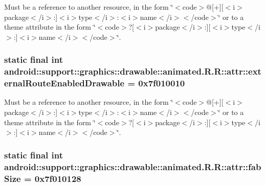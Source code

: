 Must be a reference to another resource, in the form \char`\"{}$<$code$>$@\mbox{[}+\mbox{]}\mbox{[}$<$i$>$package$<$/i$>$:\mbox{]}$<$i$>$type$<$/i$>$:$<$i$>$name$<$/i$>$$<$/code$>$\char`\"{} or to a theme attribute in the form \char`\"{}$<$code$>$?\mbox{[}$<$i$>$package$<$/i$>$:\mbox{]}\mbox{[}$<$i$>$type$<$/i$>$:\mbox{]}$<$i$>$name$<$/i$>$$<$/code$>$\char`\"{}. \hypertarget{classandroid_1_1support_1_1graphics_1_1drawable_1_1animated_1_1_r_1_1attr_b856377396eebb870b0311bc6a81b14b}{
\subsubsection[{externalRouteEnabledDrawable}]{\setlength{\rightskip}{0pt plus 5cm}static final int android::support::graphics::drawable::animated.R.R::attr::externalRouteEnabledDrawable = 0x7f010010}}
\label{classandroid_1_1support_1_1graphics_1_1drawable_1_1animated_1_1_r_1_1attr_b856377396eebb870b0311bc6a81b14b}


Must be a reference to another resource, in the form \char`\"{}$<$code$>$@\mbox{[}+\mbox{]}\mbox{[}$<$i$>$package$<$/i$>$:\mbox{]}$<$i$>$type$<$/i$>$:$<$i$>$name$<$/i$>$$<$/code$>$\char`\"{} or to a theme attribute in the form \char`\"{}$<$code$>$?\mbox{[}$<$i$>$package$<$/i$>$:\mbox{]}\mbox{[}$<$i$>$type$<$/i$>$:\mbox{]}$<$i$>$name$<$/i$>$$<$/code$>$\char`\"{}. \hypertarget{classandroid_1_1support_1_1graphics_1_1drawable_1_1animated_1_1_r_1_1attr_772a1e56e15e35730b775321c9b00ff5}{
\subsubsection[{fabSize}]{\setlength{\rightskip}{0pt plus 5cm}static final int android::support::graphics::drawable::animated.R.R::attr::fabSize = 0x7f010128}}
\label{classandroid_1_1support_1_1graphics_1_1drawable_1_1animated_1_1_r_1_1attr_772a1e56e15e35730b775321c9b00ff5}


